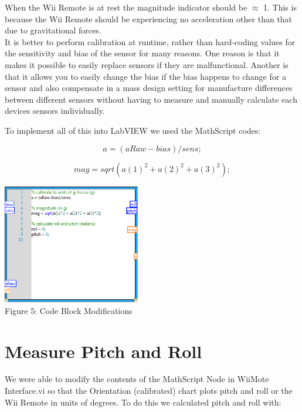 \documentclass[twoside]{article}
\begin{document}
\begin{multicols}{2}
\noindent When the Wii Remote is at rest the magnitude indicator should be $\approx$ 1. This is because the Wii Remote should be experiencing no acceleration other than that due to gravitational forces.\\

\noindent It is better to perform calibration at runtime, rather than hard-coding values for the sensitivity and bias of the sensor for many reasons. One reason is that it makes it possible to easily replace sensors if they are malfunctional. Another is that it allows you to easily change the bias if the bias happens to change for a sensor and also compensate in a mass design setting for manufacture differences between different sensors without having to measure and manually calculate each devices sensors individually.

\pagebreak
\noindent To implement all of this into LabVIEW we used the MathScript codes:

\begin{equation}a = (aRaw - bias)/sens;
\end{equation}

\begin{equation}mag = sqrt(a(1)^2 + a(2)^2 + a(3)^2);
\end{equation}

\begin{center}
\includegraphics*[width = 6cm]{FIG5.png}\\
Figure 5: Code Block Modifications
\end{center}


\section{Measure Pitch and Roll}

We were able to modify the contents of the MathScript Node in WiiMote Interface.vi so that the Orientation (calibrated) chart plots pitch and roll or the Wii Remote in units of degrees. To do this we calculated pitch and roll with:


\end{multicols}
\end{document}
